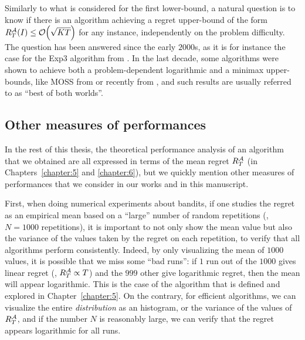 Similarly to what is considered for the first lower-bound,
a natural question is to know if there is an algorithm achieving a regret upper-bound of the form $R_T^{\mathcal{A}}(I) \leq \mathop{}\mathopen{}\mathcal{O}\mathopen{}\left(\sqrt{K T}\right)$ for any instance, independently on the problem difficulty.
The question has been answered since the early $2000$s, as it is for instance the case for the Exp3 algorithm from \cite{Auer02}.
In the last decade, some algorithms were shown to achieve both a problem-dependent logarithmic and a minimax upper-bounds,
like MOSS from \cite{Audibert2009minimax} or recently \KLUCBpp{} from \cite{Menard17},
and such results are usually referred to as ``best of both worlds''.





\subsection{Other measures of performances}
\label{sub:2:otherMeasuresPerformance}

In the rest of this thesis, the theoretical performance analysis of an algorithm that we obtained are all expressed in terms of the mean regret $R_T^{\mathcal{A}}$ (in Chapters~\ref{chapter:5} and \ref{chapter:6}), but we quickly mention other measures of performances that we consider in our works and in this manuscript.

First, when doing numerical experiments about bandits, if one studies the regret as an empirical mean based on a ``large'' number of random repetitions (\eg, $N=1000$ repetitions), it is important to not only show the mean value but also the variance of the values taken by the regret on each repetition, to verify that all algorithms perform consistently.
Indeed, by only visualizing the mean of $1000$ values, it is possible that we miss some ``bad runs'': if $1$ run out of the $1000$ gives linear regret (\ie, $R_T^{\mathcal{A}} \propto T$) and the $999$ other give logarithmic regret, then the mean will appear logarithmic.
This is the case of the \Selfish{} algorithm that is defined and explored in Chapter~\ref{chapter:5}.
On the contrary, for efficient algorithms,
we can visualize the entire \emph{distribution} as an histogram, or the variance of the values of $R_T^{\mathcal{A}}$, and if the number $N$ is reasonably large, we can verify that the regret appears logarithmic for all runs.

